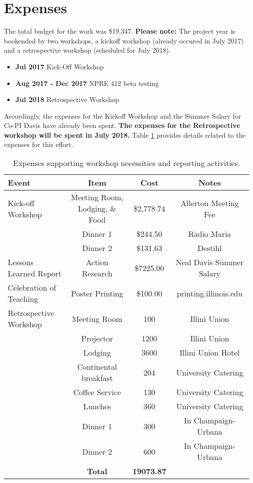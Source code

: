 \documentclass[11pt]{article}
\begin{document}
          \section{Expenses}
          The total budget for the work was \$19,347. \textbf{Please note:} The 
          project year is bookended by two workshops, a kickoff workshop 
          (already occured in July 2017) and a retrospective workshop 
          (scheduled for July 2018). 

          \begin{itemize}
                  \item \textbf{Jul 2017} Kick-Off Workshop
                  \item \textbf{Aug 2017 - Dec 2017} NPRE 412 beta testing
                  \item \textbf{Jul 2018} Retrospective Workshop
          \end{itemize}

          
          Accordingly, the expenses for the Kickoff Workshop and the Summer Salary for Co-PI 
          Davis have already been spent. \textbf{The expenses for the Retrospective 
  workshop will be spent in July 2018.} Table \ref{tab:budget} provides details related to the expenses for 
          this effort.

\begin{table}[h!]
        \begin{tabularx}{\textwidth}{|X|c|c|c|}
        \hline
        \textbf{Event} & \textbf{Item} & \textbf{Cost}  & \textbf{Notes}\\
        \hline
Kick-off Workshop &Meeting Room, Lodging, \& Food &\$2,778.74&Allerton Meeting Fee \\ 
&Dinner 1 &\$244.50&Radio Maria\\
&Dinner 2 &\$131.63&Destihl\\
\hline
Lessons Learned Report & Action Research & \$7225.00 & Neal Davis Summer Salary\\
Celebration of Teaching & Poster Printing & \$100.00 & printing.illinois.edu\\
\hline
Retrospective Workshop&Meeting Room&100&Illini Union\\
&Projector&1200&Illini Union\\
&Lodging&3600&Illini Union Hotel\\
&Continental breakfast&204&University Catering\\
&Coffee Service&130&University Catering\\
&Lunches &360&University Catering\\
&Dinner 1&300&In Champaign-Urbana\\
&Dinner 2&600&In Champaign-Urbana\\
        \hline
        &\textbf{Total}&\textbf{19073.87}&\\
        \hline
\end{tabularx}
\caption{Expenses supporting workshop necessities and reporting activities.}
\label{tab:budget}
\end{table}
\end{document}
